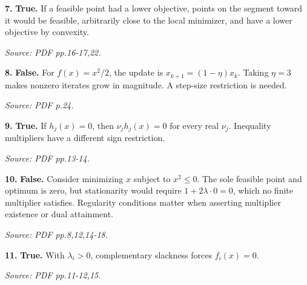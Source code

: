 \documentclass[11pt,a4paper]{article}
\begin{document}
\par\noindent\begin{minipage}{\linewidth}
\textbf{7.} \textbf{True.} If a feasible point had a lower objective, points on the segment toward it would be feasible, arbitrarily close to the local minimizer, and have a lower objective by convexity.

{\footnotesize\textit{Source: PDF pp.16-17,22.}}
\end{minipage}\par\vspace{3mm}
\par\noindent\begin{minipage}{\linewidth}
\textbf{8.} \textbf{False.} For \(f(x)=x^2/2\), the update is \(x_{k+1}=(1-\eta)x_k\). Taking \(\eta=3\) makes nonzero iterates grow in magnitude. A step-size restriction is needed.

{\footnotesize\textit{Source: PDF p.24.}}
\end{minipage}\par\vspace{3mm}
\par\noindent\begin{minipage}{\linewidth}
\textbf{9.} \textbf{True.} If \(h_j(x)=0\), then \(\nu_jh_j(x)=0\) for every real \(\nu_j\). Inequality multipliers have a different sign restriction.

{\footnotesize\textit{Source: PDF pp.13-14.}}
\end{minipage}\par\vspace{3mm}
\par\noindent\begin{minipage}{\linewidth}
\textbf{10.} \textbf{False.} Consider minimizing \(x\) subject to \(x^2\le0\). The sole feasible point and optimum is zero, but stationarity would require \(1+2\lambda\cdot0=0\), which no finite multiplier satisfies. Regularity conditions matter when asserting multiplier existence or dual attainment.

{\footnotesize\textit{Source: PDF pp.8,12,14-18.}}
\end{minipage}\par\vspace{3mm}
\par\noindent\begin{minipage}{\linewidth}
\textbf{11.} \textbf{True.} With \(\lambda_i>0\), complementary slackness forces \(f_i(x)=0\).

{\footnotesize\textit{Source: PDF pp.11-12,15.}}
\end{minipage}\par\vspace{3mm}
\end{document}
